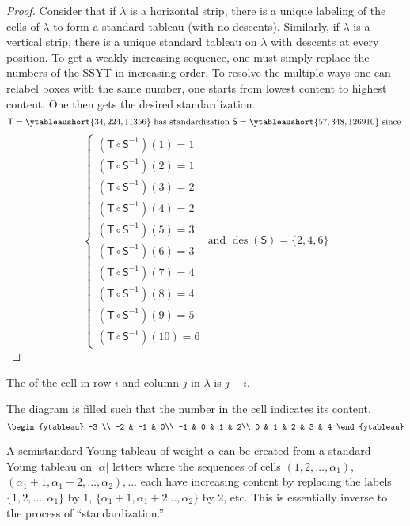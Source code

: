 \documentclass[11pt,leqno,oneside]{amsart}
\numberwithin{thm}{section}
\newcommand{\T}{\mathsf{T}} %
\renewcommand{\S}{\mathsf{S}}
\newcommand{\des}{\operatorname{des}}
\begin{document}
\begin{proof}
  Consider that if \(\lambda\) is a horizontal strip, there is a
  unique labeling of the cells of \(\lambda\) to form a standard
  tableau (with no descents). Similarly, if \(\lambda\) is a vertical
  strip, there is a unique standard tableau on \(\lambda\) with
  descents at every position. To get a weakly increasing sequence, one
  must simply replace the numbers of the SSYT in increasing order. To
  resolve the multiple ways one can relabel boxes with the same
  number, one starts from lowest content to highest content. One then
  gets the desired standardization.
\[
    \T = \ytableaushort{34,224,11356} \text{ has standardization }
    \S = \ytableaushort{57,348,1269{10}} \text{ since }
\]\[    \begin{cases}
      (\T \circ \S^{-1})(1) = 1\\
      (\T \circ \S^{-1})(2) = 1\\
      (\T \circ \S^{-1})(3) = 2\\
      (\T \circ \S^{-1})(4) = 2\\
      (\T \circ \S^{-1})(5) = 3\\
      (\T \circ \S^{-1})(6) = 3\\
      (\T \circ \S^{-1})(7) = 4\\
      (\T \circ \S^{-1})(8) = 4\\
      (\T \circ \S^{-1})(9) = 5\\
      (\T \circ \S^{-1})(10) = 6
    \end{cases}
    \text{ and } \des(\S) = \{2,4,6\}
  \]  
\end{proof}
\begin{defn}
  The  of the cell in row \(i\) and column \(j\) in
  \(\lambda\) is \(j-i\). 
\end{defn}
\begin{example}
  The diagram is filled such that the number in the cell indicates its
  content. \[
    \begin{ytableau}
      -3 \\
      -2 & -1 & 0\\
      -1 & 0 & 1 & 2\\
      0 & 1 & 2 & 3 & 4
    \end{ytableau}
  \]
\end{example}
\begin{rmk}
  A semistandard Young tableau of weight \(\alpha\) can be created from a
  standard 
  Young tableau on \(|\alpha|\) letters where the sequences of cells
  \((1,2,\ldots,\alpha_1)\), \((\alpha_1+1, \alpha_1+2, \ldots,
  \alpha_2), \ldots\) each have increasing content by replacing the labels
  \(\{1,2,\ldots,\alpha_1\}\) by \(1\), \(\{\alpha_1+1,
  \alpha_1+2\ldots, \alpha_2\}\) by \(2\), etc. This is essentially
  inverse to the process of ``standardization.''
\end{rmk}
\end{document}
